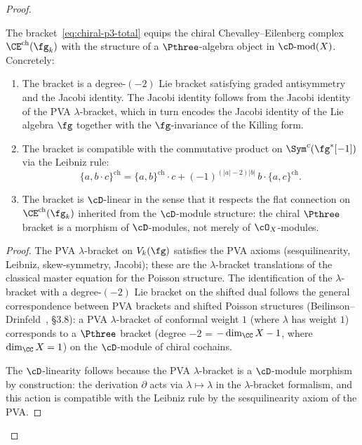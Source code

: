 \begin{proof}
\begin{proposition}
\label{prop:chiral-p3-structure}
The bracket~\eqref{eq:chiral-p3-total} equips the chiral
Chevalley--Eilenberg complex $\CE^{\mathrm{ch}}(\fg_k)$
with the structure of a $\Pthree$-algebra object in
$\cD\textrm{-}\mathrm{mod}(X)$. Concretely:
\begin{enumerate}[label=\textup{(\roman*)}]
\item The bracket is a degree-$(-2)$ Lie bracket satisfying
  graded antisymmetry and the Jacobi identity.
  The Jacobi identity follows from the Jacobi identity of the
  PVA $\lambda$-bracket, which in turn encodes the Jacobi
  identity of the Lie algebra $\fg$ together with the
  $\fg$-invariance of the Killing form.
\item The bracket is compatible with the commutative product
  on $\Sym^c(\fg^*[-1])$ via the Leibniz rule:
  \[
    \{a, b \cdot c\}^{\mathrm{ch}}
    = \{a, b\}^{\mathrm{ch}} \cdot c
    + (-1)^{(|a|-2)|b|}\, b \cdot \{a, c\}^{\mathrm{ch}}.
  \]
\item The bracket is $\cD$-linear in the sense that it
  respects the flat connection on
  $\CE^{\mathrm{ch}}(\fg_k)$ inherited from the
  $\cD$-module structure: the chiral $\Pthree$ bracket
  is a morphism of $\cD$-modules, not merely of
  $\cO_X$-modules.
\end{enumerate}
\end{proposition}

\begin{proof}
The PVA $\lambda$-bracket on $V_k(\fg)$ satisfies the PVA
axioms (sesquilinearity, Leibniz, skew-symmetry, Jacobi);
these are the $\lambda$-bracket translations of the classical
master equation for the Poisson structure.
The identification of the $\lambda$-bracket with a
degree-$(-2)$ Lie bracket on the shifted dual follows the
general correspondence between PVA brackets and shifted
Poisson structures (Beilinson--Drinfeld~\cite{BD04},
\S3.8): a PVA $\lambda$-bracket of conformal weight $1$
(where $\lambda$ has weight $1$) corresponds to a
$\Pthree$ bracket (degree $-2$ = $-\dim_\CC X - 1$, where
$\dim_\CC X = 1$) on the $\cD$-module of chiral cochains.

The $\cD$-linearity follows because the PVA
$\lambda$-bracket is a $\cD$-module morphism by construction:
the derivation $\partial$ acts via $\lambda \mapsto \lambda$
in the $\lambda$-bracket formalism, and this action is
compatible with the Leibniz rule by the sesquilinearity
axiom of the PVA.
\end{proof}


\end{proof}
